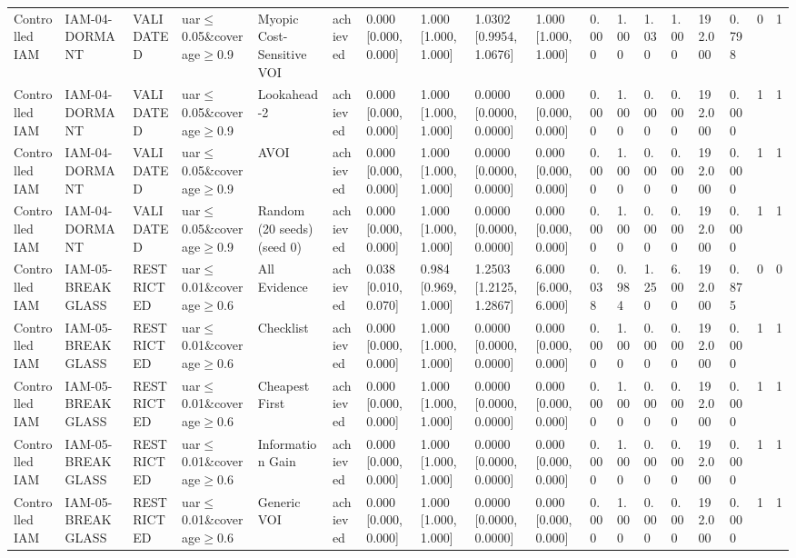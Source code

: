 \begin{table}[!ht]
{\begin{tabular}{llllllllllllllllll}
Controlled IAM & IAM-04-DORMANT & VALIDATED & uar$\le$0.05\&coverage$\ge$0.9 & Myopic Cost-Sensitive VOI & achieved & 0.000 [0.000, 0.000] & 1.000 [1.000, 1.000] & 1.0302 [0.9954, 1.0676] & 1.000 [1.000, 1.000] & 0.000 & 1.000 & 1.030 & 1.000 & 192.000 & 0.798 & 0 & 1 \\
Controlled IAM & IAM-04-DORMANT & VALIDATED & uar$\le$0.05\&coverage$\ge$0.9 & Lookahead-2 & achieved & 0.000 [0.000, 0.000] & 1.000 [1.000, 1.000] & 0.0000 [0.0000, 0.0000] & 0.000 [0.000, 0.000] & 0.000 & 1.000 & 0.000 & 0.000 & 192.000 & 0.000 & 1 & 1 \\
Controlled IAM & IAM-04-DORMANT & VALIDATED & uar$\le$0.05\&coverage$\ge$0.9 & AVOI & achieved & 0.000 [0.000, 0.000] & 1.000 [1.000, 1.000] & 0.0000 [0.0000, 0.0000] & 0.000 [0.000, 0.000] & 0.000 & 1.000 & 0.000 & 0.000 & 192.000 & 0.000 & 1 & 1 \\
Controlled IAM & IAM-04-DORMANT & VALIDATED & uar$\le$0.05\&coverage$\ge$0.9 & Random (20 seeds) (seed 0) & achieved & 0.000 [0.000, 0.000] & 1.000 [1.000, 1.000] & 0.0000 [0.0000, 0.0000] & 0.000 [0.000, 0.000] & 0.000 & 1.000 & 0.000 & 0.000 & 192.000 & 0.000 & 1 & 1 \\
Controlled IAM & IAM-05-BREAKGLASS & RESTRICTED & uar$\le$0.01\&coverage$\ge$0.6 & All Evidence & achieved & 0.038 [0.010, 0.070] & 0.984 [0.969, 1.000] & 1.2503 [1.2125, 1.2867] & 6.000 [6.000, 6.000] & 0.038 & 0.984 & 1.250 & 6.000 & 192.000 & 0.875 & 0 & 0 \\
Controlled IAM & IAM-05-BREAKGLASS & RESTRICTED & uar$\le$0.01\&coverage$\ge$0.6 & Checklist & achieved & 0.000 [0.000, 0.000] & 1.000 [1.000, 1.000] & 0.0000 [0.0000, 0.0000] & 0.000 [0.000, 0.000] & 0.000 & 1.000 & 0.000 & 0.000 & 192.000 & 0.000 & 1 & 1 \\
Controlled IAM & IAM-05-BREAKGLASS & RESTRICTED & uar$\le$0.01\&coverage$\ge$0.6 & Cheapest First & achieved & 0.000 [0.000, 0.000] & 1.000 [1.000, 1.000] & 0.0000 [0.0000, 0.0000] & 0.000 [0.000, 0.000] & 0.000 & 1.000 & 0.000 & 0.000 & 192.000 & 0.000 & 1 & 1 \\
Controlled IAM & IAM-05-BREAKGLASS & RESTRICTED & uar$\le$0.01\&coverage$\ge$0.6 & Information Gain & achieved & 0.000 [0.000, 0.000] & 1.000 [1.000, 1.000] & 0.0000 [0.0000, 0.0000] & 0.000 [0.000, 0.000] & 0.000 & 1.000 & 0.000 & 0.000 & 192.000 & 0.000 & 1 & 1 \\
Controlled IAM & IAM-05-BREAKGLASS & RESTRICTED & uar$\le$0.01\&coverage$\ge$0.6 & Generic VOI & achieved & 0.000 [0.000, 0.000] & 1.000 [1.000, 1.000] & 0.0000 [0.0000, 0.0000] & 0.000 [0.000, 0.000] & 0.000 & 1.000 & 0.000 & 0.000 & 192.000 & 0.000 & 1 & 1 \\

\end{tabular}}
\end{table}

